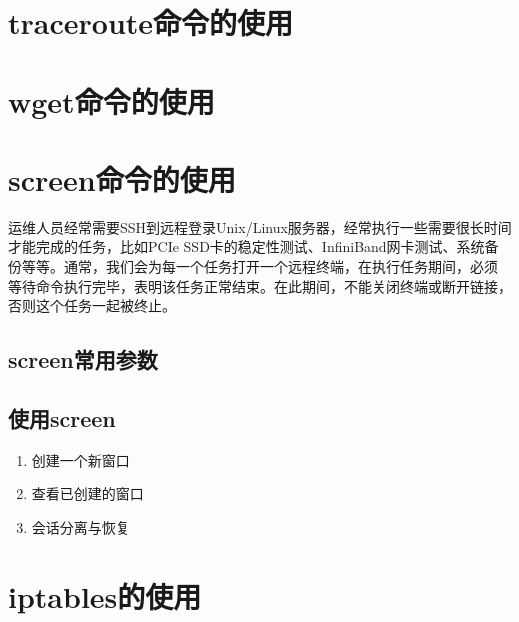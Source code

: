 \section{traceroute命令的使用}
\label{sec:tracerouteCmd}

\section{wget命令的使用}
\label{sec:wgetCmd}

\section{screen命令的使用}
\label{sec:screenCmd}

运维人员经常需要SSH到远程登录Unix/Linux服务器，经常执行一些需要很长时间
才能完成的任务，比如PCIe SSD卡的稳定性测试、InfiniBand网卡测试、系统备
份等等。通常，我们会为每一个任务打开一个远程终端，在执行任务期间，必须
等待命令执行完毕，表明该任务正常结束。在此期间，不能关闭终端或断开链接，
否则这个任务一起被终止。

\subsection{screen常用参数}

\subsection{使用screen}

\begin{enumerate}
\item 创建一个新窗口
\item 查看已创建的窗口
\item 会话分离与恢复
\end{enumerate}

\section{iptables的使用}
\label{sec:iptablesCmd}

